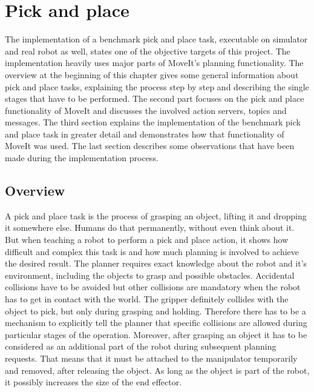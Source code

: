 
\chapter{Pick and place}
\label{chap:pick_place}

The implementation of a benchmark pick and place task, executable on simulator and real robot as well, states one of the objective targets of this project. The implementation heavily uses major parts of MoveIt's planning functionality. The overview at the beginning of this chapter gives some general information about pick and place tasks, explaining the process step by step and describing the single stages that have to be performed. The second part focuses on the pick and place functionality of MoveIt and discusses the involved action servers, topics and messages. The third section explains the implementation of the benchmark pick and place task in greater detail and demonstrates how that functionality of MoveIt was used. The last section describes some observations that have been made during the implementation process.

\section{Overview}

A pick and place task is the process of grasping an object, lifting it and dropping it somewhere else. Humans do that permanently, without even think about it. But when teaching a robot to perform a pick and place action, it shows how difficult and complex this task is and how much planning is involved to achieve the desired result. The planner requires exact knowledge about the robot and it's environment, including the objects to grasp and possible obstacles. Accidental collisions have to be avoided but other collisions are mandatory when the robot has to get in contact with the world. The gripper definitely collides with the object to pick, but only during grasping and holding. Therefore there has to be a mechanism to explicitly tell the planner that specific collisions are allowed during particular stages of the operation. Moreover, after grasping an object it has to be considered as an additional part of the robot during subsequent planning requests. That means that it must be attached to the manipulator temporarily and removed, after releasing the object. As long as the object is part of the robot, it possibly increases the size of the end effector.\\

